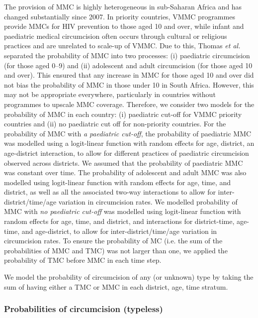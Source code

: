 \documentclass{article}
\begin{document}
The provision of MMC is highly heterogeneous in sub-Saharan Africa and has changed substantially since 2007. In priority countries, VMMC programmes provide MMCs for HIV prevention to those aged 10 and over, while infant and paediatric medical circumcision often occurs through cultural or religious practices and are unrelated to scale-up of VMMC. Due to this, Thomas {\it et al.} \cite{thomas2024substantial} separated the probability of MMC into two processes: (i) paediatric circumcision (for those aged 0--9) and (ii) adolescent and adult circumcision (for those aged 10 and over). This ensured that any increase in MMC for those aged 10 and over did not bias the probability of MMC in those under 10 in South Africa. However, this may not be appropriate everywhere, particularly in countries without programmes to upscale MMC coverage. Therefore, we consider two models for the probability of MMC in each country: (i) paediatric cut-off for VMMC priority countries and (ii) no paediatric cut off for non-priority countries. For the probability of MMC with {\it a paediatric cut-off}, the probability of paediatric MMC was modelled using a logit-linear function with random effects for age, district, an age-district interaction, to allow for different practices of paediatric circumcision observed across districts. We assumed that the probability of paediatric MMC was constant over time. The probability of adolescent and adult MMC was also modelled using logit-linear function with random effects for age, time, and district, as well as all the associated two-way interactions to allow for inter-district/time/age variation in circumcision rates. We modelled probability of MMC with {\it no paediatric cut-off} was modelled using logit-linear function with random effects for age, time, and district, and interactions for district-time, age-time, and age-district, to allow for inter-district/time/age variation in circumcision rates.  To ensure the probability of MC (i.e. the sum of the probabilities of MMC and TMC) was not larger than one, we applied the probability of TMC before MMC in each time step.

We model the probability of circumcision of any (or unknown) type by taking the sum of having either a TMC or MMC in each district, age, time stratum.


\subsubsection*{Probabilities of circumcision (typeless)}
\end{document}
